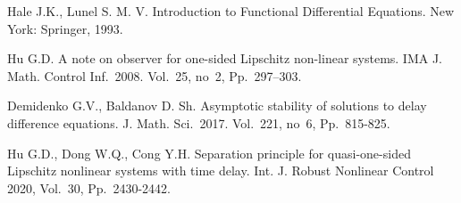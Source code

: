 \documentclass[12pt]{llncs}
\begin{document}
\begin{thebibliography}{9} %


 Hale J.K., Lunel S. M. V. Introduction to Functional Differential Equations. New York: Springer, 1993.

 Hu G.D. A note on observer for one-sided Lipschitz non-linear systems. IMA J. Math. Control Inf.~2008. Vol.~25, no~2, Pp.~297--303.

 Demidenko G.V., Baldanov D. Sh. Asymptotic stability of solutions to delay difference equations. J. Math. Sci.~2017. Vol.~221, no~6, Pp.~815-825.

 Hu G.D., Dong W.Q., Cong Y.H. Separation principle for quasi-one-sided Lipschitz nonlinear systems with time delay. Int. J. Robust Nonlinear Control 2020, Vol.~30, Pp.~2430-2442.






\end{thebibliography}
\end{document}
